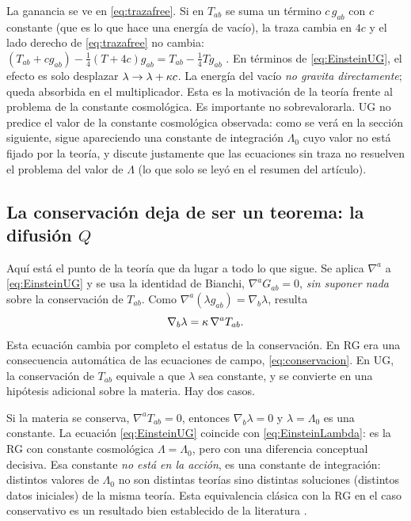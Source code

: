 La ganancia se ve en \eqref{eq:trazafree}. Si en $T_{ab}$ se suma un término $c\,g_{ab}$ con $c$ constante (que es lo que hace una energía de vacío), la traza cambia en $4c$ y el lado derecho de \eqref{eq:trazafree} no cambia: $(T_{ab}+cg_{ab})-\tfrac14(T+4c)g_{ab}=T_{ab}-\tfrac14Tg_{ab}$ . En términos de \eqref{eq:EinsteinUG}, el efecto es solo desplazar $\lambda\to\lambda+\kappa c$. La energía del vacío \emph{no gravita directamente}; queda absorbida en el multiplicador. Esta es la motivación de la teoría frente al problema de la constante cosmológica. Es importante no sobrevalorarla. UG no predice el valor de la constante cosmológica observada: como se verá en la sección siguiente, sigue apareciendo una constante de integración $\Lambda_0$ cuyo valor no está fijado por la teoría, y \cite{ellis11} discute justamente que las ecuaciones sin traza no resuelven el problema del valor de $\Lambda$ (lo que solo se leyó en el resumen del artículo).

\subsection{La conservación deja de ser un teorema: la difusión $Q$}
\label{sec:difusionQ}

Aquí está el punto de la teoría que da lugar a todo lo que sigue. Se aplica $\nabla^a$ a \eqref{eq:EinsteinUG} y se usa la identidad de Bianchi, $\nabla^aG_{ab}=0$, \emph{sin suponer nada} sobre la conservación de $T_{ab}$. Como $\nabla^a(\lambda g_{ab})=\nabla_b\lambda$, resulta
\begin{equation}
\nabla_b\lambda=\kappa\,\nabla^aT_{ab}.
\label{eq:gradlambda}
\end{equation}
Esta ecuación cambia por completo el estatus de la conservación. En RG era una consecuencia automática de las ecuaciones de campo, \eqref{eq:conservacion}. En UG, la conservación de $T_{ab}$ equivale a que $\lambda$ sea constante, y se convierte en una hipótesis adicional sobre la materia. Hay dos casos.

Si la materia se conserva, $\nabla^aT_{ab}=0$, entonces $\nabla_b\lambda=0$ y $\lambda=\Lambda_0$ es una constante. La ecuación \eqref{eq:EinsteinUG} coincide con \eqref{eq:EinsteinLambda}: es la RG con constante cosmológica $\Lambda=\Lambda_0$, pero con una diferencia conceptual decisiva. Esa constante \emph{no está en la acción}, es una constante de integración: distintos valores de $\Lambda_0$ no son distintas teorías sino distintas soluciones (distintos datos iniciales) de la misma teoría. Esta equivalencia clásica con la RG en el caso conservativo es un resultado bien establecido de la literatura \cite{padilla15,ellis11,bengochea23,carballo22}.

